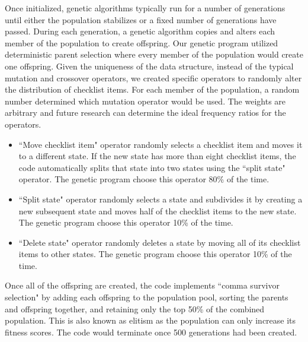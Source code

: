 \documentclass[conference]{IEEEtran}
\begin{document}
Once initialized, genetic algorithms typically run for a number of generations until either the population stabilizes or a fixed number of generations have passed. During each generation, a genetic algorithm copies and alters each member of the population to create offspring. Our genetic program utilized deterministic parent selection where every member of the population would create one offspring. Given the uniqueness of the data structure, instead of the typical mutation and crossover operators, we created specific operators to randomly alter the distribution of checklist items. For each member of the population, a random number determined which mutation operator would be used. The weights are arbitrary and future research can determine the ideal frequency ratios for the operators.

\begin{itemize}
\item ``Move checklist item" operator randomly selects a checklist item and moves it to a different state. If the new state has more than eight checklist items, the code automatically splits that state into two states using the ``split state" operator. The genetic program choose this operator 80\% of the time.
\item ``Split state" operator randomly selects a state and subdivides it by creating a new subsequent state and moves half of the checklist items to the new state. The genetic program choose this operator 10\% of the time.
\item ``Delete state" operator randomly deletes a state by moving all of its checklist items to other states. The genetic program choose this operator 10\% of the time.
\end{itemize}

Once all of the offspring are created, the code implements ``comma survivor selection" by adding each offspring to the population pool, sorting the parents and offspring together, and retaining only the top 50\% of the combined population. This is also known as elitism as the population can only increase its fitness scores. The code would terminate once 500 generations had been created.
\end{document}
